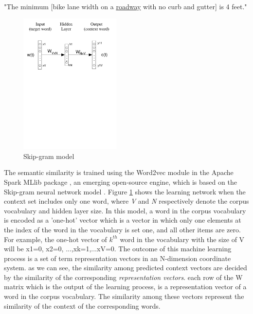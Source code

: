 \documentclass[Journal,InsideFigs, DoubleSpace]{ascelike} %
\begin{document}
%
\begin{center}
	"The minimum [bike lane width on a \underline{roadway} with no curb and gutter] is 4 feet."
\end{center}
%
%
\begin{figure}[t]
	\centering
	\includegraphics[width=0.45\textwidth]{Figure4_skip-gram-model}
	\caption{Skip-gram model}
	\label{fig:skip-gram}
\end{figure}
%
The semantic similarity is trained using the Word2vec module in the Apache Spark MLlib package \cite{apache16}, an emerging open-source engine, which is based on the Skip-gram neural network model \cite{mikolov13a}. Figure \ref{fig:skip-gram} shows the learning network when the context set includes only one word, where \textit{V} and \textit{N} respectively denote the corpus vocabulary and hidden layer size. In this model, a word in the corpus vocabulary is encoded as a 'one-hot' vector which is a vector in which only one elements at the index of the word in the vocabulary is set one, and all other items are zero. For example, the one-hot vector of $k^{th}$ word in the vocabulary with the size of V will be {x1=0, x2=0, ...,xk=1,...xV=0}. The outcome of this machine learning process is a set of term representation vectors  in an N-dimension coordinate system. as we can see, the similarity among predicted context vectors are decided by the similarity of the corresponding \textit{representation vectors}. each row of the W matrix which is the output of the learning process, is a representation vector of a word in the corpus vocabulary. The similarity among these vectors represent the similarity of the context of the corresponding words. 
\end{document}
